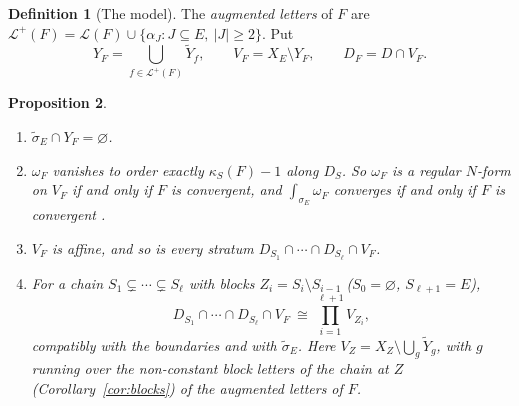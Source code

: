 \documentclass[11pt]{article}
\theoremstyle{plain}
\newtheorem{prop}{Proposition}[section]
\theoremstyle{definition}
\newtheorem{defn}[prop]{Definition}
\theoremstyle{remark}
\newcommand{\cL}{\mathcal L}
\newcommand{\tsig}{\widetilde\sigma}
\begin{document}
\begin{defn}[The model]\label{def:model}
The \emph{augmented letters} of $F$ are $\cL^+(F)=\cL(F)\cup\{\alpha_J:J\subseteq E,\ |J|\ge2\}$. Put
\[
Y_F=\bigcup_{f\in\cL^+(F)}\widetilde Y_f,\qquad V_F=X_E\setminus Y_F,\qquad D_F=D\cap V_F .
\]
\end{defn}

\begin{prop}\label{prop:model}
\begin{enumerate}[label=(\roman*)]
\item $\tsig_E\cap Y_F=\varnothing$.
\item $\omega_F$ vanishes to order exactly $\kappa_S(F)-1$ along $D_S$. So $\omega_F$ is a regular $N$-form on $V_F$ if and only if $F$ is convergent, and $\int_{\sigma_E}\omega_F$ converges if and only if $F$ is convergent \cite[Thm.~8.7(i), p.~55; Thm.~8.10, p.~56]{F}.
\item $V_F$ is affine, and so is every stratum $D_{S_1}\cap\cdots\cap D_{S_\ell}\cap V_F$.
\item For a chain $S_1\subsetneq\cdots\subsetneq S_\ell$ with blocks $Z_i=S_i\setminus S_{i-1}$ ($S_0=\varnothing$, $S_{\ell+1}=E$),
\[
D_{S_1}\cap\cdots\cap D_{S_\ell}\cap V_F\ \cong\ \prod_{i=1}^{\ell+1}V_{Z_i},
\]
compatibly with the boundaries and with $\tsig_E$. Here $V_{Z}=X_{Z}\setminus\bigcup_{g}\widetilde Y_g$, with $g$ running over the non-constant block letters of the chain at $Z$ (Corollary~\ref{cor:blocks}) of the augmented letters of $F$.
\end{enumerate}
\end{prop}
\end{document}
